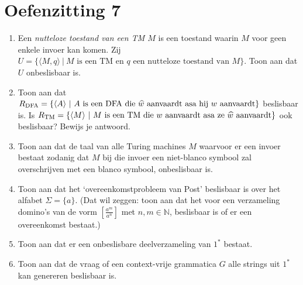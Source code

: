 \documentclass[a4paper]{article}
\begin{document}
\pagestyle{empty}

\section*{Oefenzitting 7}


\begin{enumerate}
\item Een \emph{nutteloze toestand van een TM $M$} is een toestand waarin $M$ voor geen enkele invoer kan komen. Zij $U = \{ \langle M, q \rangle \ | \ \text{$M$ is een TM en $q$ een nutteloze toestand van $M$} \}$. Toon aan dat $U$ onbeslisbaar is.
\item Toon aan dat $R_{\rm DFA} = \{ \langle A \rangle \ | \ \text{$A$ is een DFA die $\widehat{w}$ aanvaardt asa hij $w$ aanvaardt} \}$ beslisbaar is. Is $R_{\rm TM} = \{ \langle M \rangle \ | \ \text{$M$ is een TM die $w$ aanvaardt asa ze $\widehat{w}$ aanvaardt} \}$ ook beslisbaar? Bewijs je antwoord.
\item Toon aan dat de taal van alle Turing machines $M$ waarvoor er een invoer bestaat zodanig dat $M$ bij die invoer een niet-blanco symbool zal overschrijven met een blanco symbool, onbeslisbaar is.
   \item Toon aan dat het `overeenkomstprobleem van Post' beslisbaar is over het alfabet $\Sigma = \{ a \}$. (Dat wil zeggen: toon aan dat het voor een verzameling domino's van de vorm $\left[ \frac{a^m}{a^n} \right]$ met $n,m \in \mathbb{N}$, beslisbaar is of er een overeenkomst bestaat.) 
\item Toon aan dat er een onbeslisbare deelverzameling van $1^*$ bestaat.
 \item Toon aan dat de vraag of een context-vrije grammatica $G$ alle strings uit $1^*$ kan genereren beslisbaar is.
\end{enumerate}
\end{document}
